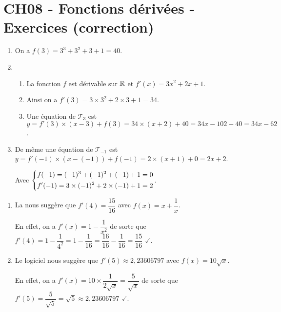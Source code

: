 \documentclass[a4paper,11pt]{article}
\author{Pierquet}
\title{\nomfichier}
\begin{document}
	
\pagestyle{fancy}

\part{CH08 - Fonctions dérivées - Exercices (correction)}


\begin{enumerate}
	\item On a $f(3)=3^3 + 3^2 + 3 + 1 = 40$.
	\item
	\begin{enumerate}
		\item La fonction $f$ est dérivable sur $\R$ et $f'(x)=3x^2+2x+1$.
		\item Ainsi on a $f'(3)= 3 \times 3^2 + 2 \times 3 + 1 = 34$.
		\item Une équation de $\mathscr{T}_3$ est $y=f'(3) \times (x-3) + f(3) = 34 \times (x+2) + 40 = 34x-102+40=34x-62$.
	\end{enumerate}
	\item De même une équation de $\mathscr{T}_{-1}$ est $y=f'(-1) \times (x-(-1)) + f(-1) = 2 \times (x+1) + 0=2x+2$.
	
	Avec $\begin{dcases}f(-1)=(-1)^3+(-1)^2+(-1)+1=0 \\ f'(-1)=3 \times (-1)^2+2 \times (-1)+1=2 \end{dcases}$.
\end{enumerate}

\medskip


\begin{enumerate}
	\item La  nous suggère que $f'(4)=\dfrac{15}{16}$ avec $f(x)=x+\dfrac{1}{x}$.
	
	En effet, on a $f'(x)=1-\dfrac{1}{x^2}$ de sorte que $f'(4)=1-\dfrac{1}{4^2}=1-\dfrac{1}{16}=\dfrac{16}{16}-\dfrac{1}{16}=\dfrac{15}{16}$ $\checked$.
	\item Le logiciel  nous suggère que $f'(5) \approx 2,23606797$ avec $f(x)=10\sqrt{x}$.
	
	En effet, on a $f'(x)=10 \times \dfrac{1}{2\sqrt{x}}=\dfrac{5}{\sqrt{x}}$ de sorte que $f'(5)=\dfrac{5}{\sqrt{5}}=\sqrt{5} \approx 2,23606797$ $\checked$.
\end{enumerate}

\medskip

\end{document}
